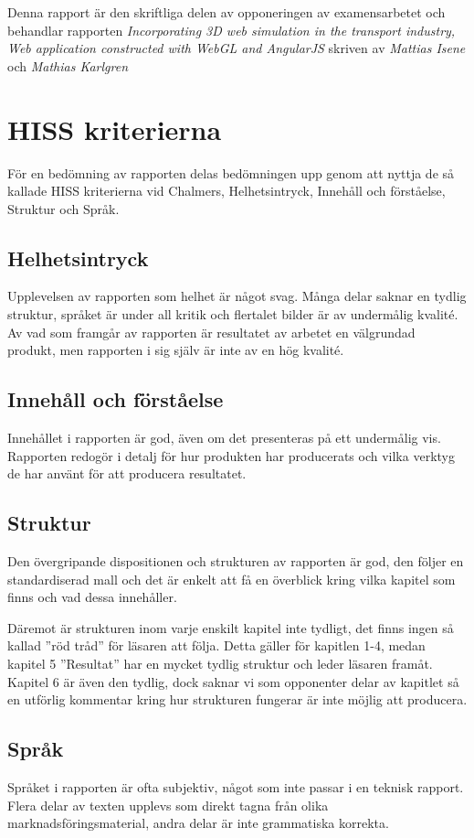 Denna rapport är den skriftliga delen av opponeringen av examensarbetet och behandlar rapporten \emph{Incorporating 3D web simulation in the transport industry, Web application constructed with WebGL and AngularJS} skriven av \emph{Mattias Isene} och \emph{Mathias Karlgren}

\section{HISS kriterierna} %
\label{sec:hiss}
    För en bedömning av rapporten delas bedömningen upp genom att nyttja de så kallade HISS kriterierna vid Chalmers, Helhetsintryck, Innehåll och förståelse, Struktur och Språk.

    \subsection{Helhetsintryck} %
    \label{sub:helhetsintryck}
        Upplevelsen av rapporten som helhet är något svag. Många delar saknar en tydlig struktur, språket är under all kritik och flertalet bilder är av undermålig kvalité. Av vad som framgår av rapporten är resultatet av arbetet en välgrundad produkt, men rapporten i sig själv är inte av en hög kvalité.

    \subsection{Innehåll och förståelse} %
    \label{sub:innehall}
        Innehållet i rapporten är god, även om det presenteras på ett undermålig vis. Rapporten redogör i detalj för hur produkten har producerats och vilka verktyg de har använt för att producera resultatet.

    \subsection{Struktur} %
    \label{sub:sturktur}
        Den övergripande dispositionen och strukturen av rapporten är god, den följer en standardiserad mall och det är enkelt att få en överblick kring vilka kapitel som finns och vad dessa innehåller. \bigskip

        Däremot är strukturen inom varje enskilt kapitel inte tydligt, det finns ingen så kallad ''röd tråd'' för läsaren att följa. Detta gäller för kapitlen 1-4, medan kapitel 5 ''Resultat'' har en mycket tydlig struktur och leder läsaren framåt. Kapitel 6 är även den tydlig, dock saknar vi som opponenter delar av kapitlet så en utförlig kommentar kring hur strukturen fungerar är inte möjlig att producera.

    \subsection{Språk} %
    \label{sub:spr_k}
        Språket i rapporten är ofta subjektiv, något som inte passar i en teknisk rapport. Flera delar av texten upplevs som direkt tagna från olika marknadsföringsmaterial, andra delar är inte grammatiska korrekta.
    
